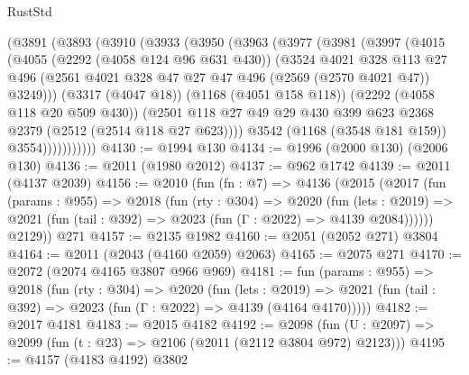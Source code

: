 \begin{lexlean}{RustStd}
\begin{coremodule}
        (@3891
          (@3893
            (@3910
              (@3933
                (@3950
                  (@3963
                    (@3977
                      (@3981
                        (@3997
                          (@4015
                            (@4055
                              (@2292 (@4058 @124 @96 @631 @430))
                              (@3524
                                @4021
                                @328
                                @113
                                @27
                                @496
                                (@2561
                                  @4021
                                  @328
                                  @47
                                  @27
                                  @47
                                  @496
                                  (@2569 (@2570 @4021 @47))
                                  @3249)))
                            (@3317 (@4047 @18))
                            (@1168 (@4051 @158 @118))
                            (@2292 (@4058 @118 @20 @509 @430))
                            (@2501
                              @118
                              @27
                              @49
                              @29
                              @430
                              @399
                              @623
                              @2368
                              @2379
                              (@2512 (@2514 @118 @27 @623))))
                          @3542
                          (@1168 (@3548 @181 @159))
                          @3554)))))))))))
@4130 := @1994 @130
@4134 := @1996 (@2000 @130) (@2006 @130)
@4136 := @2011 (@1980 @2012)
@4137 := @962 @1742
@4139 := @2011 (@4137 @2039)
@4156 := @2010
    (fun (fn : @7) =>
    @4136
      (@2015
        (@2017
          (fun (params : @955) =>
          @2018
            (fun (rty : @304) =>
            @2020
              (fun (lets : @2019) =>
              @2021 (fun (tail : @392) => @2023 (fun (Γ : @2022) => @4139 @2084))))))
        @2129))
    @271
@4157 := @2135 @1982
@4160 := @2051 (@2052 @271) @3804
@4164 := @2011 (@2043 (@4160 @2059) @2063)
@4165 := @2075 @271
@4170 := @2072 (@2074 @4165 @3807 @966 @969)
@4181 := fun (params : @955) =>
  @2018
    (fun (rty : @304) =>
    @2020
      (fun (lets : @2019) =>
      @2021 (fun (tail : @392) => @2023 (fun (Γ : @2022) => @4139 (@4164 @4170)))))
@4182 := @2017 @4181
@4183 := @2015 @4182
@4192 := @2098 (fun (U : @2097) => @2099 (fun (t : @23) => @2106 (@2011 (@2112 @3804 @972) @2123)))
@4195 := @4157 (@4183 @4192) @3802

\end{coremodule}
\end{lexlean}
